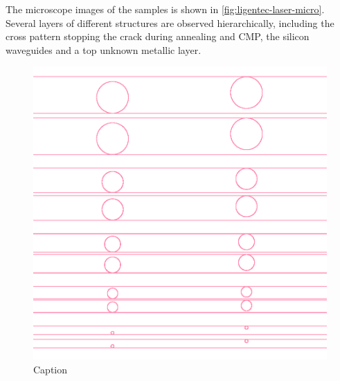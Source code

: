 The microscope images of the samples is shown in \autoref{fig:ligentec-laser-micro}. Several layers of different structures are observed hierarchically, including the cross pattern stopping the crack during annealing and CMP, the silicon waveguides and a top unknown metallic layer.

\begin{figure}
	\centering
	\includegraphics[width=.6\textwidth]{imgs/png/ligentec_gds}
	\caption{Caption}
	\label{fig:gds_ligentec}
\end{figure}

